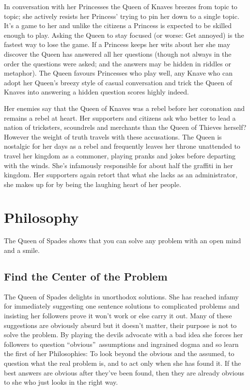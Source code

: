 In conversation with her Princesses the Queen of Knaves breezes from topic to topic; she actively resists her Princess' trying to pin her down to a single topic. It's a game to her and unlike the citizens a Princess is expected to be skilled enough to play. Asking the Queen to stay focused (or worse: Get annoyed) is the fastest way to lose the game. If a Princess keeps her wits about her she may discover the Queen has answered all her questions (though not always in the order the questions were asked; and the answers may be hidden in riddles or metaphor). The Queen favours Princesses who play well, any Knave who can adopt her Queen's breezy style of casual conversation and trick the Queen of Knaves into answering a hidden question scores highly indeed.

Her enemies say that the Queen of Knaves was a rebel before her coronation and remains a rebel at heart. Her supporters and citizens ask who better to lead a nation of tricksters, scoundrels and merchants than the Queen of Thieves herself? However the weight of truth travels with these accusations. The Queen is nostalgic for her days as a rebel and frequently leaves her throne unattended to travel her kingdom as a commoner, playing pranks and jokes before departing with the winds. She's infamously responsible for about half the graffiti in her kingdom. Her supporters again retort that what she lacks as an administrator, she makes up for by being the laughing heart of her people. 

\section*{Philosophy}

The Queen of Spades shows that you can solve any problem with an open mind and a smile.

\subsection*{Find the Center of the Problem}

The Queen of Spades delights in unorthodox solutions. She has reached infamy for immediately suggesting one sentence solutions to complicated problems and insisting her followers prove it won't work or else carry it out. Many of these suggestions are obviously absurd but it doesn't matter, their purpose is not to solve the problem. By playing the devils advocate with a bad idea she forces her followers to question \textquotedblleft obvious\textquotedblright\, assumptions and ingrained dogma and so learn the first of her Philosophies: To look beyond the obvious and the assumed, to question what the real problem is, and to act only when she has found it. If the best answers are obvious after they've been found, then they are already obvious to she who just looks in the right way.


